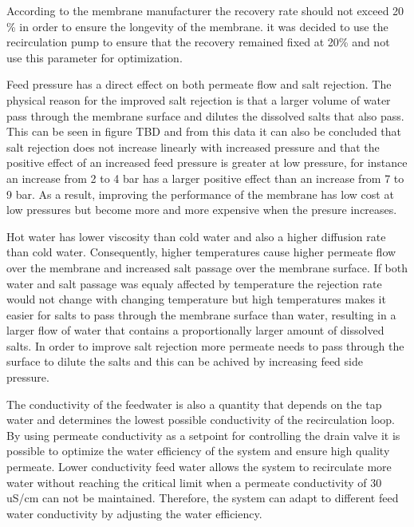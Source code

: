According to the membrane manufacturer the recovery rate should not exceed 20 \% in order to ensure the longevity of the membrane. it was decided to use the recirculation pump to ensure that the recovery remained fixed at 20\% and not use this parameter for optimization.

Feed pressure has a direct effect on both permeate flow and salt rejection. The physical reason for the improved salt rejection is that a larger volume of water pass through the membrane surface and dilutes the dissolved salts that also pass. This can be seen in figure TBD and from this data it can also be concluded that salt rejection does not increase linearly with increased pressure and that the positive effect of an increased feed pressure is greater at low pressure, for instance an increase from 2 to 4 bar has a larger positive effect than an increase from 7 to 9 bar. As a result, improving the performance of the membrane has low cost at low pressures but become more and more expensive when the presure increases.

Hot water has lower viscosity than cold water and also a higher diffusion rate than cold water. Consequently, higher temperatures cause higher permeate flow over the membrane and increased salt passage over the membrane surface. If both water and salt passage was equaly affected by temperature the rejection rate would not change with changing temperature but high temperatures makes it easier for salts to pass through the membrane surface than water, resulting in a larger flow of water that contains a proportionally larger amount of dissolved salts. In order to improve salt rejection more permeate needs to pass through the surface to dilute the salts and this can be achived by increasing feed side pressure. 

The conductivity of the feedwater is also a quantity that depends on the tap water and determines the lowest possible conductivity of the recirculation loop. By using permeate conductivity as a setpoint for controlling the drain valve it is possible to optimize the water efficiency of the system and ensure high quality permeate. Lower conductivity feed water allows the system to recirculate more water without reaching the critical limit when a permeate conductivity of 30 uS/cm can not be maintained. Therefore, the system can adapt to different feed water conductivity by adjusting the water efficiency.

